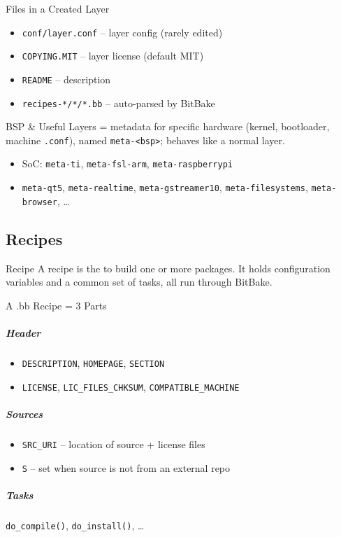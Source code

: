 
\begin{definition}{Files in a Created Layer}
    \begin{itemize}
        \item \texttt{conf/layer.conf} -- layer config (rarely edited)
        \item \texttt{COPYING.MIT} -- layer license (default MIT)
        \item \texttt{README} -- description
        \item \texttt{recipes-*/*/*.bb} -- auto-parsed by BitBake
    \end{itemize}
\end{definition}

\begin{definition}{BSP \& Useful Layers}
     = metadata for specific hardware (kernel, bootloader,
    machine \texttt{.conf}), named \texttt{meta-<bsp>}; behaves like a normal layer.
    \begin{itemize}
        \item SoC: \texttt{meta-ti}, \texttt{meta-fsl-arm}, \texttt{meta-raspberrypi}
        \item \texttt{meta-qt5}, \texttt{meta-realtime}, \texttt{meta-gstreamer10},
              \texttt{meta-filesystems}, \texttt{meta-browser}, \dots
    \end{itemize}
\end{definition}

\multend

\subsection{Recipes}

\begin{concept}{Recipe}
    A recipe is the  to
    build one or more packages. It holds configuration variables and a common set
    of tasks, all run through BitBake.
\end{concept}

\begin{definition}{A .bb Recipe = 3 Parts}
    \subparagraph{Header}
    \begin{itemize}
        \item \texttt{DESCRIPTION}, \texttt{HOMEPAGE}, \texttt{SECTION}
        \item \texttt{LICENSE}, \texttt{LIC\_FILES\_CHKSUM}, \texttt{COMPATIBLE\_MACHINE}
    \end{itemize}
    \subparagraph{Sources}
    \begin{itemize}
        \item \texttt{SRC\_URI} -- location of source + license files
        \item \texttt{S} -- set when source is not from an external repo
    \end{itemize}
    \subparagraph{Tasks} \texttt{do\_compile()}, \texttt{do\_install()}, \dots
\end{definition}

